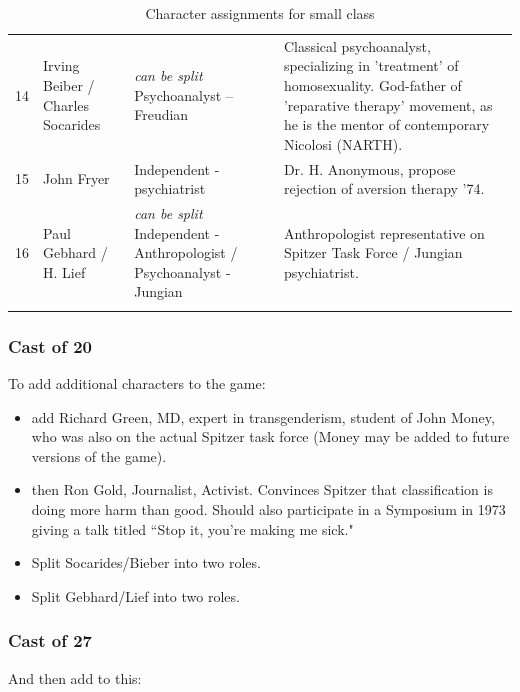 \begin{refsection}
\begin{longtable}[!t]{ | p{0.6cm} | P{3.4cm} | P{5cm} | P{6.5cm} | }
14&
Irving Beiber / Charles Socarides&
\emph{can be split} \newline
Psychoanalyst – Freudian&
Classical psychoanalyst, specializing in 'treatment' of homosexuality. God-father of 'reparative therapy' movement, as he is the mentor of contemporary Nicolosi (NARTH). \\
15&
John Fryer&
Independent - psychiatrist&
Dr. H. Anonymous, propose rejection of aversion therapy '74.\\
16&
Paul Gebhard / H. Lief&
\emph{can be split}\newline
Independent - Anthropologist / Psychoanalyst - Jungian&
Anthropologist representative on Spitzer Task Force / Jungian psychiatrist.\\ \hline

\caption{Character assignments for small class}
\label{table: charactersmall}
\end{longtable}

\subsubsection{Cast of 20}
\label{castof20}

To add additional characters to the game:

\begin{itemize}
\item add Richard Green, MD, expert in transgenderism, student of John Money, who was also on the actual Spitzer task force (Money may be added to future versions of the game).

\item then Ron Gold, Journalist, Activist. Convinces Spitzer that classification is doing more harm than good. Should also participate in a Symposium in 1973 giving a talk titled “Stop it, you're making me sick."

\item Split Socarides\slash  Bieber into two roles.

\item Split Gebhard\slash  Lief into two roles.

\end{itemize}

\subsubsection{Cast of 27}
\label{castof27}

And then add to this:


\end{refsection}
